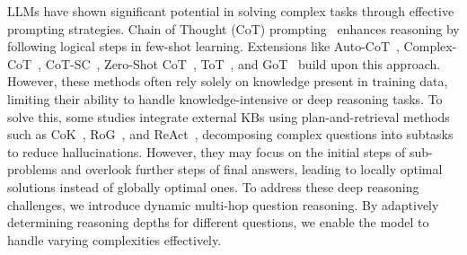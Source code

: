 LLMs have shown significant potential in solving complex tasks through effective prompting strategies. Chain of Thought (CoT) prompting~\cite{wei2022cot} enhances reasoning by following logical steps in few-shot learning. Extensions like Auto-CoT~\cite{zhang2022automatic}, Complex-CoT~\cite{fu2022complexity}, CoT-SC~\cite{wang2022self}, Zero-Shot CoT~\cite{kojima2022large}, ToT~\cite{yao2024ToT}, and GoT~\cite{besta2024graphGoT} build upon this approach. However, these methods often rely solely on knowledge present in training data, limiting their ability to handle knowledge-intensive or deep reasoning tasks.
To solve this, some studies integrate external KBs using plan-and-retrieval methods such as CoK~\cite{li2023chaincok}, RoG~\cite{rogluo2023reasoning}, and ReAct~\cite{yao2022react}, decomposing complex questions into subtasks to reduce hallucinations. 
However, they may focus on the initial steps of sub-problems and overlook further steps of final answers, leading to locally optimal solutions instead of globally optimal ones.
To address these deep reasoning challenges, we introduce dynamic multi-hop question reasoning. By adaptively determining reasoning depths for different questions, we enable the model to handle varying complexities effectively.



